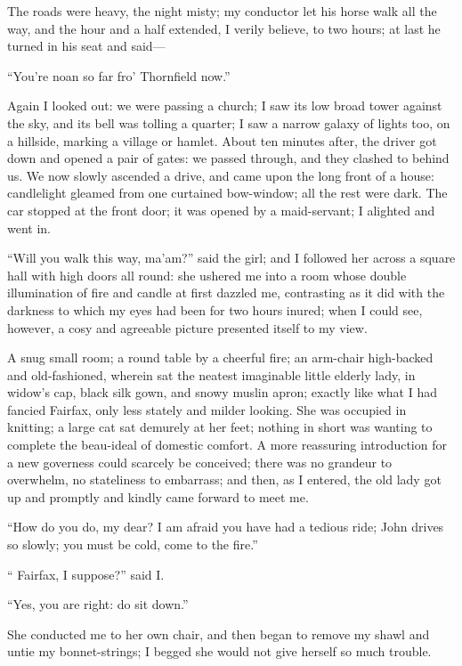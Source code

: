 The roads were heavy, the night misty; my conductor let his horse walk
all the way, and the hour and a half extended, I verily believe, to two
hours; at last he turned in his seat and said---

\enquote{You're noan so far fro' Thornfield now.}

Again I looked out: we were passing a church; I saw its low broad tower
against the sky, and its bell was tolling a quarter; I saw a narrow
galaxy of lights too, on a hillside, marking a village or hamlet. About
ten minutes after, the driver got down and opened a pair of gates: we
passed through, and they clashed to behind us. We now slowly ascended a
drive, and came upon the long front of a house: candlelight gleamed from
one curtained bow-window; all the rest were dark. The car stopped at
the front door; it was opened by a maid-servant; I alighted and went in.

\enquote{Will you walk this way, ma'am?} said the girl; and I followed
her across a square hall with high doors all round: she ushered me into
a room whose double illumination of fire and candle at first dazzled me,
contrasting as it did with the darkness to which my eyes had been for
two hours inured; when I could see, however, a cosy and agreeable
picture presented itself to my view.

A snug small room; a round table by a cheerful fire; an arm-chair
high-backed and old-fashioned, wherein sat the neatest imaginable little
elderly lady, in widow's cap, black silk gown, and snowy muslin apron;
exactly like what I had fancied \Mrs{} Fairfax, only less stately and
milder looking. She was occupied in knitting; a large cat sat demurely
at her feet; nothing in short was wanting to complete the beau-ideal of
domestic comfort. A more reassuring introduction for a new governess
could scarcely be conceived; there was no grandeur to overwhelm, no
stateliness to embarrass; and then, as I entered, the old lady got up
and promptly and kindly came forward to meet me.

\enquote{How do you do, my dear? I am afraid you have had a tedious
ride; John drives so slowly; you must be cold, come to the fire.}

\enquote{\Mrs{} Fairfax, I suppose?} said I\@.

\enquote{Yes, you are right: do sit down.}

She conducted me to her own chair, and then began to remove my shawl and
untie my bonnet-strings; I begged she would not give herself so much
trouble.

